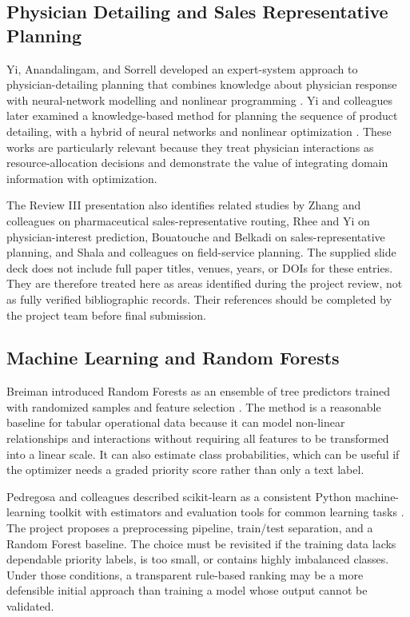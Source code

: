 \documentclass[12pt,a4paper,oneside]{report}
\begin{document}
\subsection{Physician Detailing and Sales Representative Planning}
Yi, Anandalingam, and Sorrell developed an expert-system approach to physician-detailing planning that combines knowledge about physician response with neural-network modelling and nonlinear programming \cite{yi2003}. Yi and colleagues later examined a knowledge-based method for planning the sequence of product detailing, with a hybrid of neural networks and nonlinear optimization \cite{yi2010}. These works are particularly relevant because they treat physician interactions as resource-allocation decisions and demonstrate the value of integrating domain information with optimization.

The Review III presentation also identifies related studies by Zhang and colleagues on pharmaceutical sales-representative routing, Rhee and Yi on physician-interest prediction, Bouatouche and Belkadi on sales-representative planning, and Shala and colleagues on field-service planning. The supplied slide deck does not include full paper titles, venues, years, or DOIs for these entries. They are therefore treated here as areas identified during the project review, not as fully verified bibliographic records. Their references should be completed by the project team before final submission.

\subsection{Machine Learning and Random Forests}
Breiman introduced Random Forests as an ensemble of tree predictors trained with randomized samples and feature selection \cite{breiman2001}. The method is a reasonable baseline for tabular operational data because it can model non-linear relationships and interactions without requiring all features to be transformed into a linear scale. It can also estimate class probabilities, which can be useful if the optimizer needs a graded priority score rather than only a text label.

Pedregosa and colleagues described scikit-learn as a consistent Python machine-learning toolkit with estimators and evaluation tools for common learning tasks \cite{pedregosa2011}. The project proposes a preprocessing pipeline, train/test separation, and a Random Forest baseline. The choice must be revisited if the training data lacks dependable priority labels, is too small, or contains highly imbalanced classes. Under those conditions, a transparent rule-based ranking may be a more defensible initial approach than training a model whose output cannot be validated.
\end{document}

